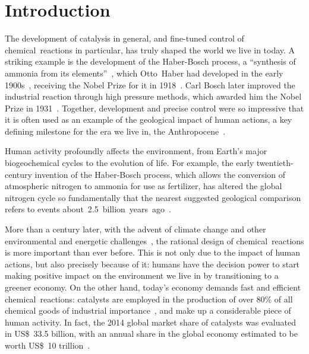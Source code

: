 \chapter*{Introduction}%
\label{ch:introduction}

The development of catalysis in general,
and fine-tuned control of chemical~reactions in particular,
has truly shaped the world we live in today.
A striking example is the development of the Haber-Bosch process,
a ``synthesis of ammonia from its elements''~\cite{Nobel_1918},
which Otto~Haber had developed in the early 1900s~\cite{Erisman_2008,Lewis_2015},
receiving the Nobel Prize for it in 1918~\cite{Nobel_1918}.
Carl Bosch later improved the industrial reaction through high pressure methods,
which awarded him the Nobel Prize in 1931~\cite{Nobel_1931}.
Together,
development and precise control were so impressive that it is often used
as an example of the geological impact of human actions,
a key defining milestone for
the era we live in,
the Anthropocene~\cite{Smil_1999,Canfield_2010,Lewis_2015}.
%
\begin{citacao}
	Human activity profoundly affects the environment,
	from Earth’s major biogeochemical cycles to the evolution of life.
	For example,
	the early twentieth-century invention of the Haber-Bosch process,
	which allows the conversion of atmospheric nitrogen to ammonia for use as fertilizer,
	has altered the global nitrogen cycle so fundamentally
	that the nearest suggested geological comparison refers to events
	about~2.5~billion~years~ago~\cite{Lewis_2015}.
\end{citacao}

More than a century later,
with the advent of climate change and other environmental and energetic challenges~\cite{Bertozzi_2016},
the rational design of chemical~reactions is more important than ever before.
This is not only due to the impact of human actions,
but also precisely because of it:
humans have the decision power to start making positive impact on the environment we live in
by transitioning to a greener economy.
On the other hand,
today's economy demands fast and efficient chemical~reactions:
catalysts are employed in the production of over 80\% of all chemical
goods of industrial
importance~\cite{Breakthrough_Catalyst,GlobalCatalystMarket},
and make up a considerable piece of human activity.
In fact,
the 2014 global market share of catalysts was evaluated in US\$~33.5 billion,
with an annual share in the global economy estimated to be worth US\$~10
trillion~\cite{GlobalCatalystMarket}.

